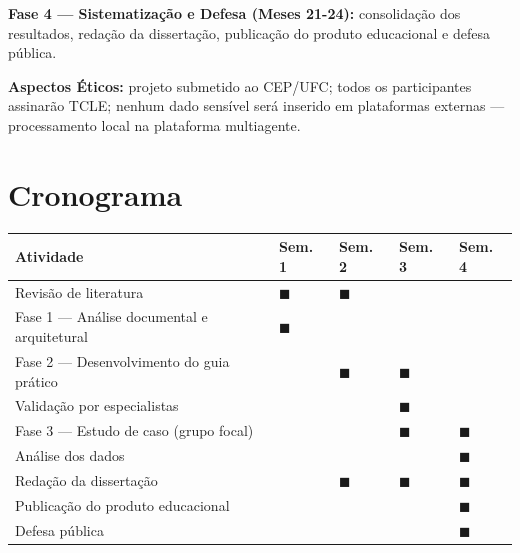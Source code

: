 \documentclass[12pt,a4paper]{article}
\begin{document}
\noindent\textbf{Fase 4 --- Sistematização e Defesa (Meses 21-24):} consolidação dos resultados, redação da dissertação, publicação do produto educacional e defesa pública.

\vspace{0.3cm}
\noindent\textbf{Aspectos Éticos:} projeto submetido ao CEP/UFC; todos os participantes assinarão TCLE; nenhum dado sensível será inserido em plataformas externas --- processamento local na plataforma multiagente.

\section{Cronograma}

\begin{center}
\renewcommand{\arraystretch}{1.3}
\begin{tabularx}{\textwidth}{|l|X|X|X|X|}
\hline
\textbf{Atividade} & \textbf{Sem. 1} & \textbf{Sem. 2} & \textbf{Sem. 3} & \textbf{Sem. 4} \\
\hline
Revisão de literatura & $\blacksquare$ & $\blacksquare$ & & \\
\hline
Fase 1 --- Análise documental e arquitetural & $\blacksquare$ & & & \\
\hline
Fase 2 --- Desenvolvimento do guia prático & & $\blacksquare$ & $\blacksquare$ & \\
\hline
Validação por especialistas & & & $\blacksquare$ & \\
\hline
Fase 3 --- Estudo de caso (grupo focal) & & & $\blacksquare$ & $\blacksquare$ \\
\hline
Análise dos dados & & & & $\blacksquare$ \\
\hline
Redação da dissertação & & $\blacksquare$ & $\blacksquare$ & $\blacksquare$ \\
\hline
Publicação do produto educacional & & & & $\blacksquare$ \\
\hline
Defesa pública & & & & $\blacksquare$ \\
\hline
\end{tabularx}
\end{center}
\end{document}
